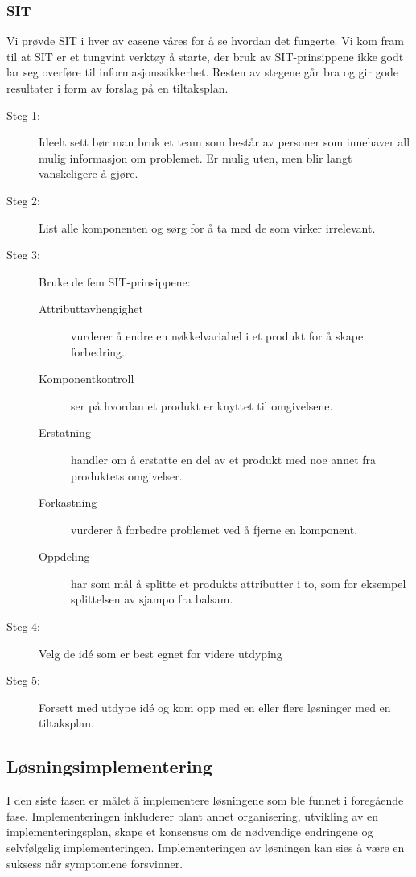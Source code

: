 \subsubsection{SIT} Vi prøvde SIT i hver av casene våres for å se hvordan det fungerte. Vi kom fram til at SIT er et tungvint verktøy å starte, der bruk av SIT-prinsippene ikke godt lar seg overføre til informasjonssikkerhet. Resten av stegene går bra og gir gode resultater i form av forslag på en tiltaksplan.  
    \begin{description}
        \item[Steg 1:] Ideelt sett bør man bruk et team som består av personer som innehaver all mulig informasjon om problemet. Er mulig uten, men blir langt vanskeligere å gjøre.
        \item[Steg 2:] List alle komponenten og sørg for å ta med de som virker irrelevant. 
        \item[Steg 3:] Bruke de fem SIT-prinsippene:
                    \begin{description}
                    \item[Attributtavhengighet] vurderer å endre en nøkkelvariabel i et produkt for å skape forbedring.
                    \item[Komponentkontroll] ser på hvordan et produkt er knyttet til omgivelsene.
                    \item[Erstatning] handler om å erstatte en del av et produkt med noe annet fra produktets omgivelser.
                    \item[Forkastning] vurderer å forbedre problemet ved å fjerne en komponent. 
                    \item[Oppdeling] har som mål å splitte et produkts attributter i to, som for eksempel splittelsen av sjampo fra balsam.
                    \end{description}
        \item[Steg 4:] Velg de idé som er best egnet for videre utdyping
        \item[Steg 5:] Forsett med utdype idé og kom opp med en eller flere løsninger med en tiltaksplan.
    \end{description}

\subsection{Løsningsimplementering}
I den siste fasen er målet å implementere løsningene som ble funnet i foregående fase. Implementeringen inkluderer blant annet organisering, utvikling av en implementeringsplan, skape et konsensus om de nødvendige endringene og selvfølgelig implementeringen. Implementeringen av løsningen kan sies å være en suksess når symptomene forsvinner. 

